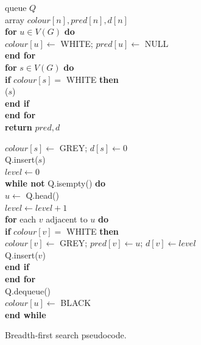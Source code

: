 \begin{figure}[hbtp]

{
queue $Q$ \\

array $colour[n], pred[n], d[n]$ \\

\textbf{for} $u \in V(G)$ \textbf{do} \\

\> $colour[u] \gets $ WHITE; $pred[u] \gets $ NULL \\

\textbf{end for}\\

\textbf{for}  $s\in V(G)$ \textbf{do} \\

\> \textbf{if} $colour[s] = $ WHITE \textbf{then} \\

\> \> ($s$) \\

\> \textbf{end if}\\

\textbf{end for}\\

\textbf{return} $pred, d$\\
}

{
$colour[s] \gets $ GREY; $d[s] \gets 0$ \\

Q.insert($s$) \\

$level \gets 0$ \\

\textbf{while not} Q.isempty() \textbf{do} \\

\> $u \gets $ Q.head() \\

\> $level \gets level + 1$ \\

\> \textbf{for} each $v$ adjacent to $u$ \textbf{do} \\

\> \> \textbf{if} $colour[v] = $ WHITE \textbf{then} \\

\> \> \> $colour[v] \gets $ GREY; $pred[v] \gets u$; $d[v] \gets level$
\\

\> \> \> Q.insert($v$) \\

\> \> \textbf{end if} \\

\> \textbf{end for} \\

\> Q.dequeue() \\

\> $colour[u] \gets $ BLACK \\

\textbf{end while} \\
}

\caption{Breadth-first search pseudocode.}
\label{fig:BFScode}

\end{figure}


